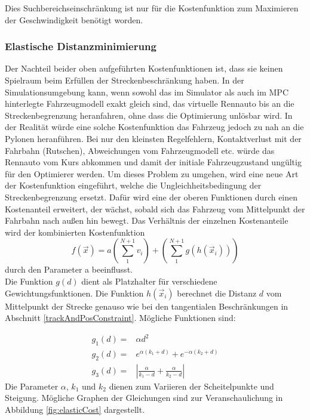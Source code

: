 \documentclass{like}
\begin{document}
Dies Suchbereichseinschränkung ist nur für die Kostenfunktion zum Maximieren der Geschwindigkeit benötigt worden.

\subsubsection*{Elastische Distanzminimierung}
Der Nachteil beider oben aufgeführten Kostenfunktionen ist, dass sie keinen Spielraum beim Erfüllen der Streckenbeschränkung haben. In der Simulationsumgebung kann, wenn sowohl das im Simulator als auch im \ac{MPC} hinterlegte Fahrzeugmodell exakt gleich sind, das virtuelle Rennauto bis an die Streckenbegrenzung heranfahren, ohne dass die Optimierung unlösbar wird. In der Realität würde eine solche Kostenfunktion das Fahrzeug jedoch zu nah an die Pylonen heranführen. Bei nur den kleinsten Regelfehlern, Kontaktverlust mit der Fahrbahn (Rutschen), Abweichungen vom Fahrzeugmodell etc. würde das Rennauto vom Kurs abkommen und damit der initiale Fahrzeugzustand ungültig für den Optimierer werden. Um dieses Problem zu umgehen, wird eine neue Art der Kostenfunktion eingeführt, welche die Ungleichheitsbedingung der Streckenbegrenzung ersetzt. Dafür wird eine der oberen Funktionen durch einen Kostenanteil erweitert, der wächst, sobald sich das Fahrzeug vom Mittelpunkt der Fahrbahn nach außen hin bewegt. Das Verhältnis der einzelnen Kostenanteile wird der kombinierten Kostenfunktion  
\begin{equation}
	f(\vec{x}) = a \left(\sum_{1}^{N+1} v_i \right) + \left(\sum_{1}^{N+1} g \left(h \left(\vec{x}_i \right) \right) \right)
\end{equation}
durch den Parameter a beeinflusst. \\

Die Funktion $g(d)$ dient als Platzhalter für verschiedene Gewichtungsfunktionen. Die Funktion $h(\vec{x}_i)$ berechnet die Distanz \(d\) vom Mittelpunkt der Strecke genauso wie bei den tangentialen Beschränkungen in Abschnitt \ref{trackAndPosConstraint}. Mögliche Funktionen sind:

\begin{eqnarray}
	g_1(d) = &\alpha d^2 \\
	g_2(d) = &e^{\alpha (k_1 + d)} + e^{-\alpha(k_2 + d)} \label{eq:distMeasure1}\\
	g_3(d) = &|\frac{\alpha}{k_1-d} + \frac{\alpha}{k_2 - d}| \label{eq:distMeasure2}
\end{eqnarray}
Die Parameter $\alpha$, $k_1$ und $k_2$ dienen zum Variieren der Scheitelpunkte und Steigung.
Mögliche Graphen der Gleichungen sind zur Veranschaulichung in Abbildung \ref{fig:elasticCost} dargestellt.
\end{document}
